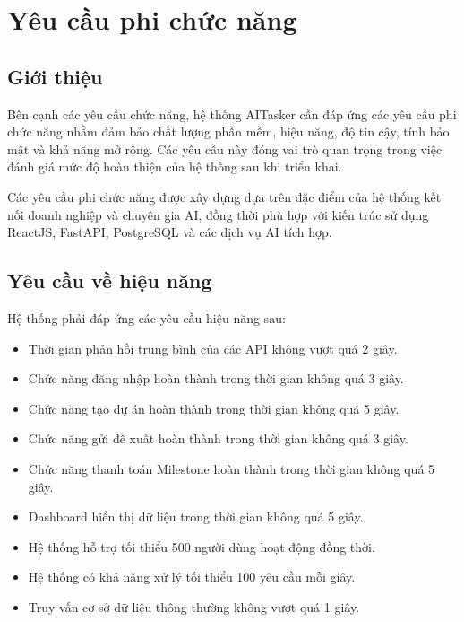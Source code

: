 \chapter{Yêu cầu phi chức năng}

\section{Giới thiệu}

Bên cạnh các yêu cầu chức năng, hệ thống AITasker cần đáp ứng các yêu cầu phi
chức năng nhằm đảm bảo chất lượng phần mềm, hiệu năng, độ tin cậy, tính bảo
mật và khả năng mở rộng. Các yêu cầu này đóng vai trò quan trọng trong việc
đánh giá mức độ hoàn thiện của hệ thống sau khi triển khai.

Các yêu cầu phi chức năng được xây dựng dựa trên đặc điểm của hệ thống kết nối
doanh nghiệp và chuyên gia AI, đồng thời phù hợp với kiến trúc sử dụng ReactJS,
FastAPI, PostgreSQL và các dịch vụ AI tích hợp.


\section{Yêu cầu về hiệu năng}

Hệ thống phải đáp ứng các yêu cầu hiệu năng sau:

\begin{itemize}

\item Thời gian phản hồi trung bình của các API không vượt quá 2 giây.

\item Chức năng đăng nhập hoàn thành trong thời gian không quá 3 giây.

\item Chức năng tạo dự án hoàn thành trong thời gian không quá 5 giây.

\item Chức năng gửi đề xuất hoàn thành trong thời gian không quá 3 giây.

\item Chức năng thanh toán Milestone hoàn thành trong thời gian không quá 5 giây.

\item Dashboard hiển thị dữ liệu trong thời gian không quá 5 giây.

\item Hệ thống hỗ trợ tối thiểu 500 người dùng hoạt động đồng thời.

\item Hệ thống có khả năng xử lý tối thiểu 100 yêu cầu mỗi giây.

\item Truy vấn cơ sở dữ liệu thông thường không vượt quá 1 giây.

\end{itemize}

